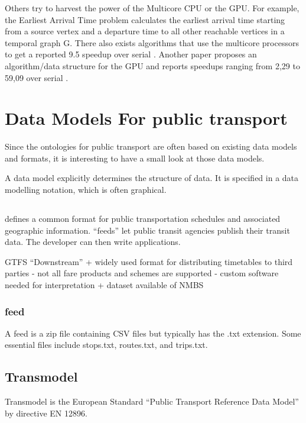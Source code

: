 Others try to harvest the power of the Multicore CPU or the GPU. For example, the Earliest Arrival Time problem calculates the earliest arrival time starting from a source vertex and a departure time to all other reachable vertices in a temporal graph G. There also exists algorithms that use the multicore processors to get a reported 9.5 speedup over serial  \cite{ni_parallel_2017}. Another paper proposes an algorithm/data structure for the GPU and reports speedups ranging from 2,29 to 59,09 over serial  \cite{haryan_gpu_2020}.


\section{Data Models For public transport}\label{section:data_model_rel_work}

Since the ontologies for public transport are often based on existing data models and formats, it is interesting to have a small look at those data models.

A data model explicitly determines the structure of data. It is specified in a data modelling notation, which is often graphical.

\subsection{}
 defines a common format for public transportation schedules and associated geographic information. “feeds” let public transit agencies publish their transit data. The developer can then write applications.

GTFS
“Downstream” 
+ widely used format for distributing timetables to third
  parties
- not all fare products and schemes are supported
- custom software needed for interpretation 
+ dataset available of NMBS

\subsubsection{ feed}
A feed is a zip file containing CSV files but typically has the .txt extension. Some essential files include stops.txt, routes.txt, and trips.txt.

\subsection{Transmodel}
Transmodel is the European Standard “Public Transport Reference Data Model” by directive EN 12896.

